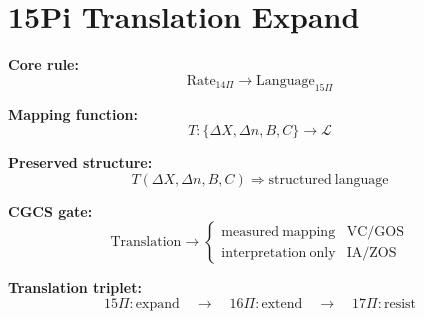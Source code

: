 \section*{15Pi Translation Expand}

\textbf{Core rule:}
\[
\mathrm{Rate}_{14\Pi}
\rightarrow
\mathrm{Language}_{15\Pi}
\]

\textbf{Mapping function:}
\[
T : \{\Delta X, \Delta n, B, C\} \rightarrow \mathcal{L}
\]

\textbf{Preserved structure:}
\[
T(\Delta X, \Delta n, B, C)
\Rightarrow \mathrm{structured\ language}
\]

\textbf{CGCS gate:}
\[
\mathrm{Translation} \rightarrow
\begin{cases}
\mathrm{measured\ mapping} & \text{VC/GOS} \\
\mathrm{interpretation\ only} & \text{IA/ZOS}
\end{cases}
\]

\textbf{Translation triplet:}
\[
15\Pi:\mathrm{expand}
\quad\rightarrow\quad
16\Pi:\mathrm{extend}
\quad\rightarrow\quad
17\Pi:\mathrm{resist}
\]
